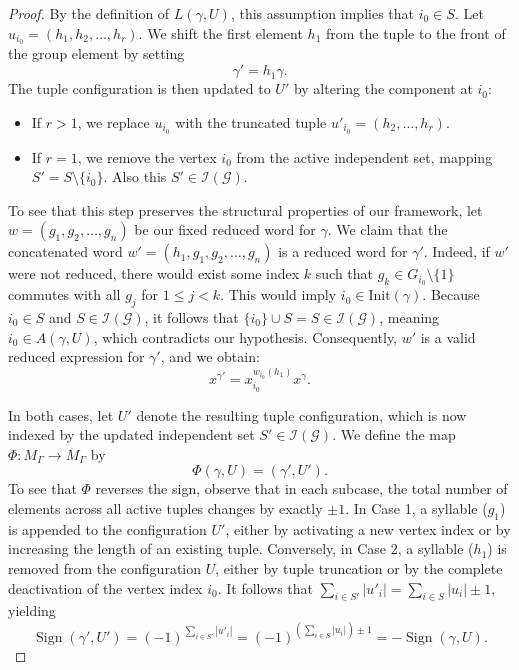 \documentclass[11pt,reqno]{amsart}
\numberwithin{equation}{section} %
\theoremstyle{definition}
\theoremstyle{remark}
\numberwithin{equation}{section}
\begin{document}
\begin{proof}
    \item[Case 2: $i_0 \notin A(\gamma,U)$.] 
    By the definition of $L(\gamma, U)$, this assumption implies that $i_0 \in S$. Let $u_{i_0} = (h_1, h_2, \dots, h_r)$. We shift the first element $h_1$ from the tuple to the front of the group element by setting 
    \begin{equation*}
        \gamma' = h_1\gamma.
    \end{equation*}
    The tuple configuration is then updated to $U'$ by altering the component at $i_0$:
    \begin{itemize}
        \item If $r > 1$, we replace $u_{i_0}$ with the truncated tuple $u'_{i_0} = (h_2, \dots, h_r)$.
        \item If $r = 1$, we remove the vertex $i_0$ from the active independent set, mapping $S' = S \setminus \{i_0\}$. Also this $S'\in \mathcal{I(G)}$.
    \end{itemize}
    To see that this step preserves the structural properties of our framework, let $w = (g_1, g_2, \dots, g_n)$ be our fixed reduced word for $\gamma$. We claim that the concatenated word $w' = (h_1, g_1, g_2, \dots, g_n)$ is a reduced word for $\gamma'$. Indeed, if $w'$ were not reduced, there would exist some index $k$ such that $g_k \in G_{i_0} \setminus \{1\}$ commutes with all $g_j$ for $1 \le j < k$. This would imply $i_0 \in \mathrm{Init}(\gamma)$. Because $i_0 \in S$ and $S \in  \mathcal I(\mathcal G)$, it follows that $\{i_0\} \cup S = S \in  \mathcal I(\mathcal G)$, meaning $i_0 \in A(\gamma,U)$, which  contradicts our hypothesis. Consequently, $w'$ is a valid reduced expression for $\gamma'$, and we obtain:
    \begin{equation*}
        x^{\gamma'} = x_{i_0}^{w_{i_0}(h_1)} x^\gamma.
    \end{equation*}


In both cases, let $U'$ denote the resulting tuple configuration, which is now indexed by the updated independent set $S' \in \mathcal{I}(\mathcal{G})$. We define the map $\Phi:M_\Gamma\to M_\Gamma$ by 
\begin{equation*}
    \Phi(\gamma,U) = (\gamma',U').
\end{equation*}
To see that $\Phi$ reverses the sign, observe that in each subcase, the total number of elements across all active tuples changes by exactly $\pm 1$. In Case 1, a syllable ($g_1$) is appended to the configuration $U'$, either by activating a new vertex index or by increasing the length of an existing tuple. Conversely, in Case 2, a syllable ($h_1$) is removed from the configuration $U$, either by tuple truncation or by the complete deactivation of the vertex index $i_0$. It follows that $\sum_{i \in S'} |u'_i| = \sum_{i \in S} |u_i| \pm 1$, yielding
\begin{equation*}
\operatorname{Sign}(\gamma',U') = (-1)^{\sum_{i \in S'} |u'_i|} = (-1)^{\left(\sum_{i \in S} |u_i|\right) \pm 1} = -\operatorname{Sign}(\gamma,U).
\end{equation*}


\end{proof}
\end{document}
